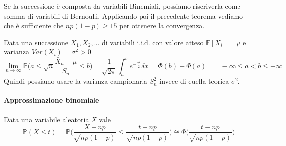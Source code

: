 \begin{observation}
	Se la successione è composta da variabili Binomiali, possiamo riscriverla come somma di variabili di Bernoulli. Applicando poi il precedente teorema vediamo che è sufficiente che $np(1-p) \geq 15$ per ottenere la convergenza.
\end{observation}

\begin{proposition}
	Data una successione $X_1, X_2, \ldots$ di variabili i.i.d. con valore atteso $\mathbb{E}[X_i] = \mu$ e varianza $Var(X_i)=\sigma^2 > 0$
	\begin{equation}
		\lim_{n \to \infty}\mathbb{P} \bigg(a \leq \sqrt{n}\frac{\bar{X}_n - \mu}{S_n} \leq b\bigg) = \frac{1}{\sqrt{2 \pi}} \int_{a}^{b}e^{-\frac{x^2}{2}}dx = \Phi(b) - \Phi(a) \quad\quad -\infty \leq a < b \leq + \infty
	\end{equation}
	Quindi possiamo usare la varianza campionaria $S^2_n$ invece di quella teorica $\sigma^2$.
\end{proposition}

\paragraph{Approssimazione binomiale}
\begin{definition}
	Data una variabile aleatoria $X$ vale
	\begin{equation}
		\mathbb{P}(X \leq t)=\mathbb{P}\bigg(\frac{X - np}{\sqrt{np(1-p)}} \leq \frac{t-np}{\sqrt{np(1-p)}}\bigg) \cong \Phi\bigg(\frac{t-np}{\sqrt{np(1-p)}}\bigg)
	\end{equation}
\end{definition}